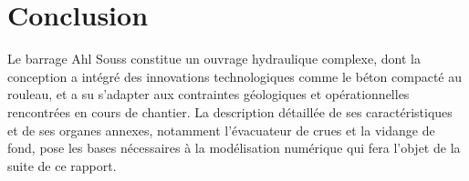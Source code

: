 \section{Conclusion}
\label{sec:conclusion_chap4}

Le barrage Ahl Souss constitue un ouvrage hydraulique complexe, dont la conception a intégré des innovations technologiques comme le béton compacté au rouleau, et a su s'adapter aux contraintes géologiques et opérationnelles rencontrées en cours de chantier. La description détaillée de ses caractéristiques et de ses organes annexes, notamment l'évacuateur de crues et la vidange de fond, pose les bases nécessaires à la modélisation numérique qui fera l'objet de la suite de ce rapport.
